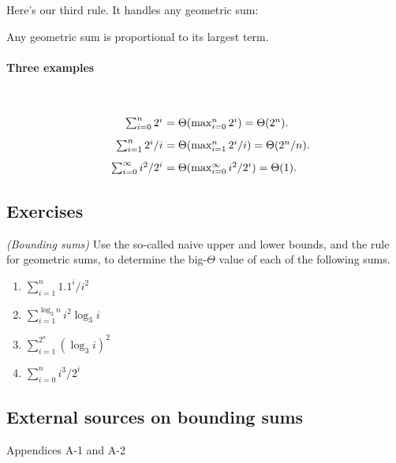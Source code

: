 Here's our third rule.  It handles any geometric sum:

\begin{observation}
  Any geometric sum is proportional to its largest term.
\end{observation}
\paragraph{Three examples}~{}

\[
\begin{array}{rr@{~}l}
  & \sum_{i=0}^n 2^i &= \Theta(\max_{i=0}^n 2^i) = \Theta(2^n). \\[2ex]
  & \sum_{i=1}^n 2^i/i &= \Theta(\max_{i=1}^n 2^i/i) = \Theta(2^n/n).   \\[2ex]
  & \sum_{i=0}^\infty i^2/2^i&  = \Theta(\max_{i=0}^\infty i^2/2^i) = \Theta(1).
\end{array}
\]

\subsection{Exercises}

\exercise \emph{(Bounding sums)}
Use the so-called naive upper and lower bounds, and the rule for geometric sums,
to determine the big-$\Theta$ value of each of the following sums.


\begin{enumerate}[label=(\alph*)]
\item $\displaystyle\sum_{i=1}^n 1.1^i/i^2$

\item $\displaystyle\sum_{i=1}^{\log_2 n} i^2\log_3 i$

\item $\displaystyle\sum_{i=1}^{2^n} (\log_3 i)^2$
  
\item $\displaystyle\sum_{i=0}^{n} i^3/2^i$
\end{enumerate}

\subsection{External sources on bounding sums}
\begin{mylist}
\item \CLRS Appendices A-1 and A-2
\end{mylist}
  
